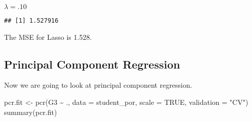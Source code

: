 \documentclass[
]{article}
\newenvironment{Shaded}{\begin{snugshade}}{\end{snugshade}}
\newcommand{\AttributeTok}[1]{\textcolor[rgb]{0.77,0.63,0.00}{#1}}
\newcommand{\ConstantTok}[1]{\textcolor[rgb]{0.00,0.00,0.00}{#1}}
\newcommand{\DecValTok}[1]{\textcolor[rgb]{0.00,0.00,0.81}{#1}}
\newcommand{\FunctionTok}[1]{\textcolor[rgb]{0.00,0.00,0.00}{#1}}
\newcommand{\NormalTok}[1]{#1}
\newcommand{\OtherTok}[1]{\textcolor[rgb]{0.56,0.35,0.01}{#1}}
\newcommand{\SpecialCharTok}[1]{\textcolor[rgb]{0.00,0.00,0.00}{#1}}
\newcommand{\StringTok}[1]{\textcolor[rgb]{0.31,0.60,0.02}{#1}}
\begin{document}
\(\lambda = .10\)

\begin{Shaded}
\end{Shaded}

\begin{verbatim}
## [1] 1.527916
\end{verbatim}

The MSE for Lasso is 1.528.

\hypertarget{principal-component-regression}{%
\subsection{Principal Component
Regression}\label{principal-component-regression}}

Now we are going to look at principal component regression.

\begin{Shaded}
\begin{Highlighting}[]
\NormalTok{pcr.fit }\OtherTok{\textless{}{-}} \FunctionTok{pcr}\NormalTok{(G3 }\SpecialCharTok{\textasciitilde{}}\NormalTok{ ., }\AttributeTok{data =}\NormalTok{ student\_por, }\AttributeTok{scale =} \ConstantTok{TRUE}\NormalTok{, }\AttributeTok{validation =} \StringTok{"CV"}\NormalTok{)}
\FunctionTok{summary}\NormalTok{(pcr.fit)}
\end{Highlighting}
\end{Shaded}
\end{document}
